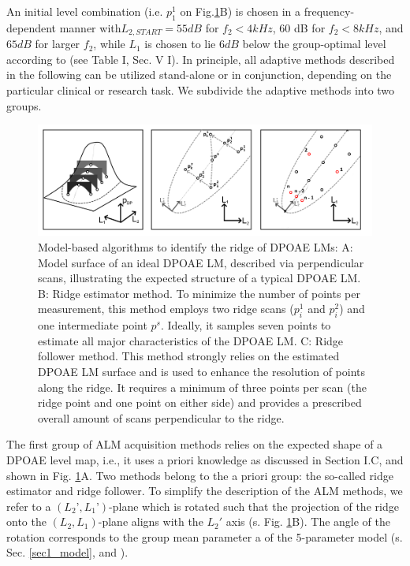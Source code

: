 \documentclass[journal,twoside,web]{ieeecolor2}
\begin{document}
An initial level combination (i.e. $p_1^1$ on Fig.\ref{fig_AMB}B) is chosen in a frequency-dependent manner with$L_{2,START} = 55 dB$ for $f_2 < 4 kHz$, 60 dB for $f_2 < 8 kHz$, and $65 dB$ for larger $f_2$, while $L_1$ is chosen to lie $6 dB$ below the group-optimal level according to \cite{ZD2020} (see Table I, Sec. V  I).
 In principle, all adaptive methods described in the following can be utilized stand-alone or in conjunction, depending on the particular clinical or research task.
We subdivide the adaptive methods into two groups.

\begin{figure}
\includegraphics[width=\textwidth]{Fig_ALM_ModelBased} %
\caption{Model-based algorithms to identify the ridge of DPOAE LMs: A: Model surface of an ideal DPOAE LM, described via perpendicular scans, illustrating the expected structure of a typical DPOAE LM.
B: Ridge estimator method.
To minimize the number of points per measurement, this method employs two ridge scans ($p^1_i$ and $p^2_i$) and one intermediate point $p^s$.
Ideally, it samples seven points to estimate all major characteristics of the DPOAE LM.
C: Ridge follower method.
This method strongly relies on the estimated DPOAE LM surface and is used to enhance the resolution of points along the ridge.
It requires a minimum of three points per scan (the ridge point and one point on either side) and provides a prescribed overall amount of scans perpendicular to the ridge.}
\label{fig_AMB}
\end{figure}

The first group of ALM acquisition methods relies on the expected shape of a DPOAE level map, i.e., it uses a priori knowledge as discussed in Section I.C, and shown in Fig. \ref{fig_AMB}A.
Two methods belong to the a priori group: the so-called ridge estimator and ridge follower.
To simplify the description of the ALM methods, we refer to a $(L_2’, L_1’)$-plane which is rotated such that the projection of the ridge onto the $(L_2, L_1)$-plane aligns with the $L_2'$ axis (s. Fig. \ref{fig_AMB}B).
The angle of the rotation corresponds to the group mean parameter a of the 5-parameter model (s. Sec. \ref{sec1_model}, and \cite{ZD2020}).
\end{document}
